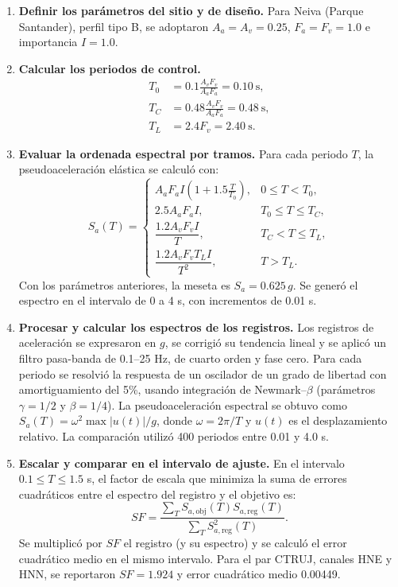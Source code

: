 \documentclass[12pt,oneside]{report}
\begin{document}
\begin{enumerate}
    \item \textbf{Definir los parámetros del sitio y de diseño.}
    Para Neiva (Parque Santander), perfil tipo B, se adoptaron
    $A_a=A_v=0.25$, $F_a=F_v=1.0$ e importancia $I=1.0$.
    \item \textbf{Calcular los periodos de control.}
    \begin{align*}
        T_0&=0.1\frac{A_vF_v}{A_aF_a}=0.10\ \mathrm{s},\\
        T_C&=0.48\frac{A_vF_v}{A_aF_a}=0.48\ \mathrm{s},\\
        T_L&=2.4F_v=2.40\ \mathrm{s}.
    \end{align*}
    \item \textbf{Evaluar la ordenada espectral por tramos.}
    Para cada periodo $T$, la pseudoaceleración elástica se calculó con:
    \begin{equation}
    S_a(T)=
    \begin{cases}
    A_aF_aI\left(1+1.5\frac{T}{T_0}\right), & 0\leq T<T_0,\\[6pt]
    2.5A_aF_aI, & T_0\leq T\leq T_C,\\[6pt]
    \dfrac{1.2A_vF_vI}{T}, & T_C<T\leq T_L,\\[10pt]
    \dfrac{1.2A_vF_vT_LI}{T^2}, & T>T_L.
    \end{cases}
    \label{eq:espectro-nsr10}
    \end{equation}
    Con los parámetros anteriores, la meseta es $S_a=0.625\,g$. Se generó el
    espectro en el intervalo de 0 a 4 s, con incrementos de 0.01 s.
    \item \textbf{Procesar y calcular los espectros de los registros.}
    Los registros de aceleración se expresaron en $g$, se corrigió su tendencia
    lineal y se aplicó un filtro pasa-banda de 0.1--25 Hz, de cuarto orden y
    fase cero. Para cada periodo se resolvió la respuesta de un oscilador de un
    grado de libertad con amortiguamiento del 5\%, usando integración de
    Newmark--$\beta$ (parámetros $\gamma=1/2$ y $\beta=1/4$). La pseudoaceleración
    espectral se obtuvo como $S_a(T)=\omega^2\max|u(t)|/g$, donde
    $\omega=2\pi/T$ y $u(t)$ es el desplazamiento relativo. La comparación
    utilizó 400 periodos entre 0.01 y 4.0 s.
    \item \textbf{Escalar y comparar en el intervalo de ajuste.}
    En el intervalo $0.1\leq T\leq1.5$ s, el factor de escala que minimiza la
    suma de errores cuadráticos entre el espectro del registro y el objetivo es:
    \begin{equation}
        SF=
        \frac{\sum_T S_{a,\mathrm{obj}}(T)S_{a,\mathrm{reg}}(T)}
        {\sum_T S_{a,\mathrm{reg}}^2(T)}.
    \end{equation}
    Se multiplicó por $SF$ el registro (y su espectro) y se calculó el error
    cuadrático medio en el mismo intervalo. Para el par CTRUJ, canales HNE y
    HNN, se reportaron $SF=1.924$ y error cuadrático medio 0.00449.
\end{enumerate}
\end{document}
